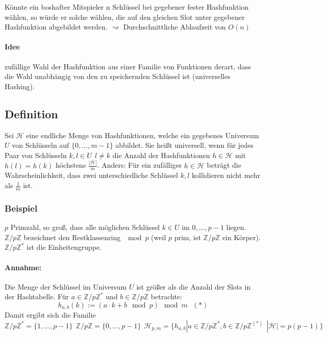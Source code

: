 Könnte ein boshafter Mitspieler n Schlüssel bei gegebener fester Hashfunktion wählen, so würde er solche wählen, die auf den gleichen Slot unter gegebener Hashfunktion abgebildet werden. $\rightsquigarrow$ Durchschnittliche Ablaufzeit von $O(n)$
\paragraph{Idee} zufällige Wahl der Hashfunktion aus einer Familie von Funktionen derart, dass die Wahl unabhängig von den zu speichernden Schlüssel ist (universelles Hashing).
\subsection{Definition}
Sei $\mathcal{H}$ eine endliche Menge von Hashfunktionen, welche ein gegebenes Universum $U$ von Schlüsseln auf $\{ 0,\ldots,m-1 \}$ abbildet. Sie heißt universell, wenn für jedes Paar von Schlüsseln $k,l\in U~~l\neq k$ die Anzahl der Hashfunktionen $h\in \mathcal{H}$ mit $h(l)=h(k)$ höchstens $\frac{|\mathcal{H}|}{m}$. Anders: Für ein zufälliges $h\in\mathcal{H}$ beträgt die Wahrscheinlichkeit, dass zwei unterschiedliche Schlüssel $k,l$ kollidieren nicht mehr als $\frac{1}{m}$ ist.
\subsubsection{Beispiel}
$p$ Primzahl, so groß, dass alle möglichen Schlüssel $k\in U$ im $0,\ldots,p-1$ liegen. $\mathbb{Z}/p\mathbb{Z}$ bezeichnet den Restklassenring $\mod{p}$ (weil $p$ prim, ist $\mathbb{Z}/p\mathbb{Z}$ ein Körper).
$\mathbb{Z}/p\mathbb{Z}^*$ ist die Einheitengruppe.
\paragraph{Annahme:} Die Menge der Schlüssel im Universum $U$ ist größer als die Anzahl der Slots in der Hashtabelle. Für $a\in \mathbb{Z}/p\mathbb{Z}^*$ und $b\in \mathbb{Z}/p\mathbb{Z}$ betrachte:
\[ h_{a,b}(k) := (a\cdot k + b \mod{p})\mod{m} ~~~(*)\]
Damit ergibt sich die Familie
\[ \mathbb{Z}/p\mathbb{Z}^*=\{ 1,\ldots,p-1 \}~~\mathbb{Z}/p\mathbb{Z}=\{ 0,\ldots,p-1 \}~~ \mathcal{H}_{p,m}=\{h_{a,b}|a\in \mathbb{Z}/p\mathbb{Z}^*, b \in\mathbb{Z}/p\mathbb{Z}^{(*)}~~|\mathcal{H}|=p(p-1)  \} \]
